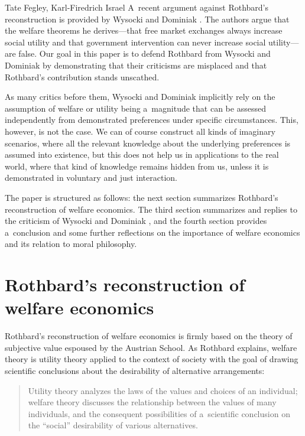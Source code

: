 \begin{artengenv2auth}{Tate Fegley, Karl-Firedrich Israel}
A~recent argument against Rothbard's reconstruction is provided by  Wysocki and Dominiak
\parencite*[][]{wysocki_how_2023}.
The authors argue that the welfare theorems he derives---that free market exchanges always increase social utility and that government intervention can never increase social utility---are false. Our goal in this paper is to defend Rothbard from Wysocki and Dominiak 
\parencite*[][]{wysocki_how_2023} %
 by demonstrating that their criticisms are misplaced and that Rothbard's contribution stands unscathed.



As many critics before them, Wysocki and Dominiak implicitly rely on the assumption of welfare or utility being a~magnitude that can be assessed independently from demonstrated preferences under specific circumstances. This, however, is not the case. We can of course construct all kinds of imaginary scenarios, where all the relevant knowledge about the underlying preferences is assumed into existence, but this does not help us in applications to the real world, where that kind of knowledge remains hidden from us, unless it is demonstrated in voluntary and just interaction.



The paper is structured as follows: the next section summarizes Rothbard's reconstruction of welfare economics. The third section summarizes and replies to the criticism of Wysocki and Dominiak 
\parencite*[][]{wysocki_how_2023}, %
 and the fourth section provides a~conclusion and some further reflections on the importance of welfare economics and its relation to moral philosophy.



\section{Rothbard's reconstruction of welfare economics}

Rothbard's reconstruction of welfare economics is firmly based on the theory of subjective value espoused by the Austrian School. As Rothbard explains, welfare theory is utility theory applied to the context of society with the goal of drawing scientific conclusions about the desirability of alternative arrangements:



\begin{quote}
Utility theory analyzes the laws of the values and choices of an individual; welfare theory discusses the relationship between the values of many individuals, and the consequent possibilities of a~scientific conclusion on the ``social'' desirability of various alternatives. 
\parencite[][p.289]{rothbard_toward_2011}%
\end{quote}





\end{artengenv2auth}

